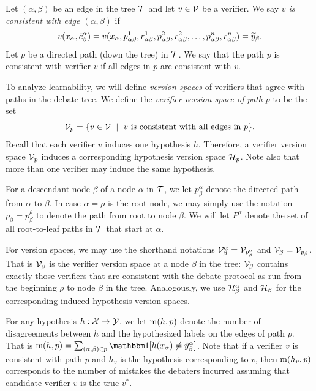 \documentclass[11pt,letterpaper]{article}
\theoremstyle{definition}
\theoremstyle{plain}
\begin{document}
Let $(\alpha,\beta)$ be an edge in the tree ${\mathcal T}$ and let $v\in{\mathcal V}$ be a verifier. We say \emph{$v$ is consistent with edge $(\alpha, \beta)$} if
\[
v(x_\alpha, \bar{c}^\alpha_\beta) = v(x_\alpha, {p}^1_{\alpha\beta}, {r}^1_{\alpha\beta}, {p}^2_{\alpha\beta}, {r}^2_{\alpha\beta}, \ldots,  {p}^n_{\alpha\beta}, {r}^n_{\alpha\beta}) = {\widetilde{y}}_\beta.
\]
Let $p$ be a directed path (down the tree) in ${\mathcal T}$. We say that the path $p$ is consistent with verifier $v$ if all edges in $p$ are consistent with $v$.

To analyze learnability, we will define \emph{version spaces} of verifiers that agree with paths in the debate tree.
 We define the \emph{verifier version space of path $p$} to be the set
\[
 {\mathcal V}_p = \{ v\in{\mathcal V} ~\mid~ v \text{ is consistent with all edges in }p\}.
\]
Recall that each verifier $v$ induces one hypothesis $h$. Therefore, a verifier version space ${\mathcal V}_p$ induces a corresponding hypothesis version space ${{\mathcal H}}_p$. Note also that more than one verifier may induce the same hypothesis.

For a descendant node $\beta$ of a node $\alpha$ in ${\mathcal T}$, we let $p^\alpha_\beta$ denote the directed path from $\alpha$ to $\beta$.  In case $\alpha =\rho$ is the root node, we may simply use the notation $p_\beta = p^\rho_\beta$ to denote the path from root to node $\beta$. We will let $P^\alpha$ denote the set of all root-to-leaf paths in ${\mathcal T}$ that start at $\alpha$.

For version spaces, we may use the shorthand notations ${\mathcal V}^\alpha_\beta = {\mathcal V}_{p^\alpha_\beta}$ and ${\mathcal V}_\beta = {\mathcal V}_{p_\beta}$. That is ${\mathcal V}_\beta$ is the verifier version space at a node $\beta$ in the tree: ${\mathcal V}_\beta$ contains exactly those verifiers that are consistent with the debate protocol as run from the beginning $\rho$ to node $\beta$ in the tree. Analogously, we use ${{\mathcal H}}^\alpha_\beta$ and ${{\mathcal H}}_\beta$ for the corresponding induced hypothesis version spaces.

For any hypothesis $h:{\mathcal X}\to{\mathcal Y}$, we let $\mathrm{m}(h, p )$ denote the number of disagreements between $h$ and the hypothesized labels on the edges of path $p$. That is $\mi(h, p) = \sum_{(\alpha, \beta)\in p}\indct[h(x_\alpha)\neq \hy^\alpha_\beta]$.
Note that if a verifier $v$ is consistent with path $p$ and $h_v$ is the hypothesis corresponding to $v$, then  $\mathrm{m}(h_v, p)$ corresponds to the number of mistakes the debaters incurred assuming that candidate verifier $v$ is the true $v^*$.

\end{document}
